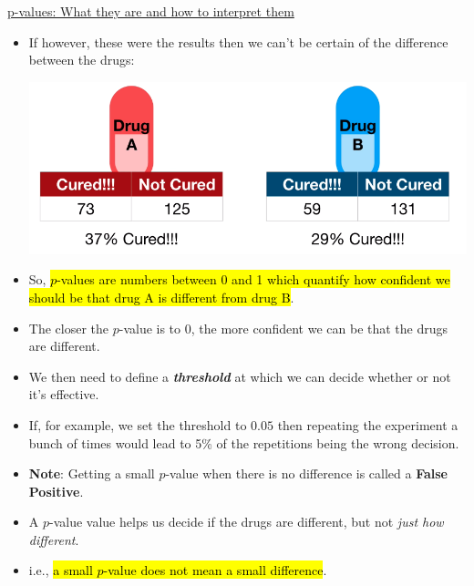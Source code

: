 \documentclass[12pt, titlepage, french]{report}
\begin{document}
\begin{YTB_SUMM_AUTO_NUMB}[label = {SQ-p-val-what}]{\href{https://www.youtube.com/watch?v=vemZtEM63GY&feature=youtu.be}{p-values: What they are and how to interpret them}}
\begin{itemize}[leftmargin = *]
	\item	If however, these were the results then we can't be certain of the difference between the drugs:
		\begin{center}
		\includegraphics[scale=0.4]{src/SQ-DRUGTEST-CUREiffy.png}
		\end{center}
	\item	So, \hl{$p$-values are numbers between 0 and 1 which quantify how confident we should be that drug A is different from drug B}.
	\item	The closer the $p$-value is to 0, the more confident we can be that the drugs are different.
	\item	We then need to define a \textit{\textbf{threshold}} at which we can decide whether or not it's effective.
	\item	If, for example, we set the threshold to $0.05$ then repeating the experiment a bunch of times would lead to 5\% of the repetitions being the wrong decision.
	\item	\textbf{Note}:	Getting a small $p$-value when there is no difference is called a \textbf{False Positive}.
	\item	A $p$-value value helps us decide if the drugs are different, but not \textit{just how different}.
	\item	i.e., \hl{a small $p$-value does not mean a small difference}.
\end{itemize}
\end{YTB_SUMM_AUTO_NUMB}
\end{document}
